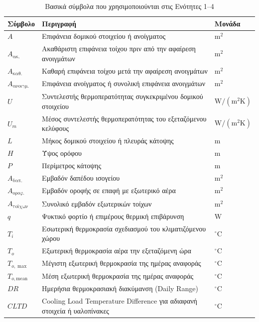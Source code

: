 \documentclass[12pt,a4paper]{article}
\begin{document}
\begin{table}[H]
\centering
\small
\caption{Βασικά σύμβολα που χρησιμοποιούνται στις Ενότητες 1--4}
\begin{tabularx}{\textwidth}{C{2.2cm} L C{2.8cm}}
\toprule
\textbf{Σύμβολο} & \textbf{Περιγραφή} & \textbf{Μονάδα} \\
\midrule
\(A\) & Επιφάνεια δομικού στοιχείου ή ανοίγματος & \(\mathrm{m^2}\) \\
\(A_{\text{ακ.}}\) & Ακαθάριστη επιφάνεια τοίχου πριν από την αφαίρεση ανοιγμάτων & \(\mathrm{m^2}\) \\
\(A_{\text{καθ.}}\) & Καθαρή επιφάνεια τοίχου μετά την αφαίρεση ανοιγμάτων & \(\mathrm{m^2}\) \\
\(A_{\text{ανοιγμ.}}\) & Επιφάνεια ανοίγματος ή συνολική επιφάνεια ανοιγμάτων & \(\mathrm{m^2}\) \\
\(U\) & Συντελεστής θερμοπερατότητας συγκεκριμένου δομικού στοιχείου & \(\mathrm{W/(m^2K)}\) \\
\(U_m\) & Μέσος συντελεστής θερμοπερατότητας του εξεταζόμενου κελύφους & \(\mathrm{W/(m^2K)}\) \\
\(L\) & Μήκος δομικού στοιχείου ή πλευράς κάτοψης & \(\mathrm{m}\) \\
\(H\) & Ύψος ορόφου & \(\mathrm{m}\) \\
\(P\) & Περίμετρος κάτοψης & \(\mathrm{m}\) \\
\midrule
\(A_{\text{δαπ.}}\) & Εμβαδόν δαπέδου ισογείου & \(\mathrm{m^2}\) \\
\(A_{\text{οροφ.}}\) & Εμβαδόν οροφής σε επαφή με εξωτερικό αέρα & \(\mathrm{m^2}\) \\
\(A_{\text{τοίχων}}\) & Συνολικό εμβαδόν εξωτερικών τοίχων & \(\mathrm{m^2}\) \\
\midrule
\(q\) & Ψυκτικό φορτίο ή επιμέρους θερμική επιβάρυνση & \(\mathrm{W}\) \\
\(T_i\) & Εσωτερική θερμοκρασία σχεδιασμού του κλιματιζόμενου χώρου & \({}^\circ\mathrm{C}\) \\
\(T_o\) & Εξωτερική θερμοκρασία αέρα την εξεταζόμενη ώρα & \({}^\circ\mathrm{C}\) \\
\(T_{o,\max}\) & Μέγιστη εξωτερική θερμοκρασία της ημέρας αναφοράς & \({}^\circ\mathrm{C}\) \\
\(T_{o,\mathrm{mean}}\) & Μέση εξωτερική θερμοκρασία της ημέρας αναφοράς & \({}^\circ\mathrm{C}\) \\
\(DR\) & Ημερήσια θερμοκρασιακή διακύμανση (\textenglish{Daily Range}) & \({}^\circ\mathrm{C}\) \\
\(CLTD\) & \textenglish{Cooling Load Temperature Difference} για αδιαφανή στοιχεία ή υαλοπίνακες & \({}^\circ\mathrm{C}\) \\

\end{tabularx}
\end{table}
\end{document}
